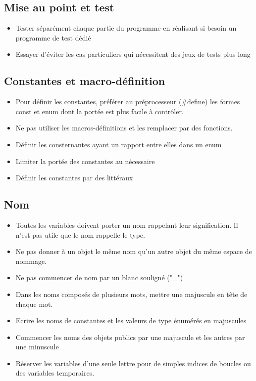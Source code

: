 \documentclass[10pt,a4paper,twoside]{article}
\begin{document}
\subsection{Mise au point et test}
\begin{itemize}
\item Tester séparément chaque partie du programme en réalisant si besoin un programme de test dédié
\item Essayer d’éviter les cas particuliers qui nécessitent des jeux de tests plus long
\end{itemize}
\subsection{Constantes et macro-définition}
\begin{itemize}
\item Pour définir les constantes, préférer au préprocesseur (\#define) les formes const et enum dont la portée est plus facile à contrôler.
\item Ne pas utiliser les macros-définitions et les remplacer par des fonctions.
\item Définir les consternantes ayant un rapport entre elles dans un enum
\item Limiter la portée des constantes au nécessaire
\item Définir les constantes par des littéraux
\end{itemize}
\subsection{Nom}
\begin{itemize}
\item Toutes les variables doivent porter un nom rappelant leur signification. Il n'est pas utile que le nom rappelle le type.
\item Ne pas donner à un objet le même nom qu'un autre objet du même espace de nommage.
\item Ne pas commencer de nom par un blanc souligné ("\_")
\item Dans les noms composés de plusieurs mots, mettre une majuscule en tête de chaque mot.
\item Ecrire les noms de constantes et les valeurs de type énumérés en majuscules
\item Commencer les noms des objets publics par une majuscule et les autres par une minuscule
\item Réserver les variables d'une seule lettre pour de simples indices de boucles ou des variables temporaires.
\end{itemize}
\end{document}
